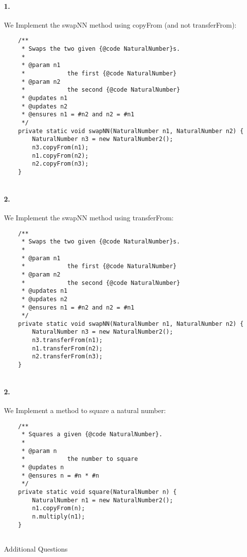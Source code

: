 \documentclass[10pt]{article}
\begin{document}
\maketitle



\paragraph{1. }


We Implement the swapNN method using copyFrom (and not transferFrom): 
\begin{lstlisting}
    /**
     * Swaps the two given {@code NaturalNumber}s.
     *
     * @param n1
     *            the first {@code NaturalNumber}
     * @param n2
     *            the second {@code NaturalNumber}
     * @updates n1
     * @updates n2
     * @ensures n1 = #n2 and n2 = #n1
     */
    private static void swapNN(NaturalNumber n1, NaturalNumber n2) {
        NaturalNumber n3 = new NaturalNumber2();
        n3.copyFrom(n1);
        n1.copyFrom(n2);
        n2.copyFrom(n3);
    }


\end{lstlisting}
\vspace{50mm}
\paragraph{2. }


We Implement the swapNN method using transferFrom: 
\begin{lstlisting}
    /**
     * Swaps the two given {@code NaturalNumber}s.
     *
     * @param n1
     *            the first {@code NaturalNumber}
     * @param n2
     *            the second {@code NaturalNumber}
     * @updates n1
     * @updates n2
     * @ensures n1 = #n2 and n2 = #n1
     */
    private static void swapNN(NaturalNumber n1, NaturalNumber n2) {
        NaturalNumber n3 = new NaturalNumber2();
        n3.transferFrom(n1);
        n1.transferFrom(n2);
        n2.transferFrom(n3);
    }


\end{lstlisting}

\paragraph{2. }


We Implement a method to square a natural number: 
\begin{lstlisting}
    /**
     * Squares a given {@code NaturalNumber}.
     *
     * @param n
     *            the number to square
     * @updates n
     * @ensures n = #n * #n
     */
    private static void square(NaturalNumber n) {
        NaturalNumber n1 = new NaturalNumber2();
        n1.copyFrom(n);
        n.multiply(n1);
    }


\end{lstlisting}
\Huge Additional Questions
\normalsize
\end{document}
